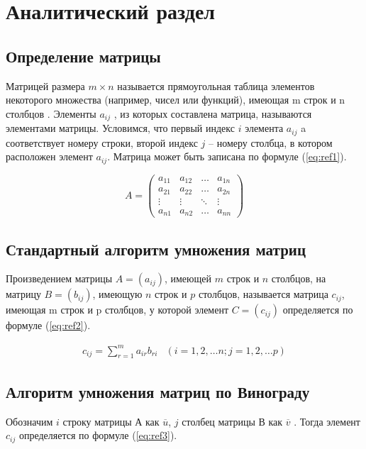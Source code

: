 \chapter{Аналитический раздел}

\section{Определение матрицы}
Матрицей размера $m \times n$ называется прямоугольная таблица элементов некоторого множества 
(например, чисел или функций), имеющая m строк и n столбцов \cite{angem}.
Элементы $a_{ij}$ , из которых составлена матрица, называются элементами матрицы.
Условимся, что первый индекс $i$ элемента $a_{ij}$ a
соответствует номеру строки, второй индекс $j$ – номеру столбца, в котором расположен элемент $a_{ij}$.
Матрица может быть записана по формуле (\ref{eq:ref1}).

\begin{equation}
	A = \left(
	\begin{array}{cccc}
		a_{11} & a_{12} & \ldots & a_{1n} \\
		a_{21} & a_{22} & \ldots & a_{2n} \\
		\vdots & \vdots & \ddots & \vdots \\
		a_{n1} & a_{n2} & \ldots & a_{nn}
	\end{array}
	\right)
	\label{eq:ref1}
\end{equation}

\section{Стандартный алгоритм умножения матриц}
Произведением матрицы $A = (a_{ij})$, имеющей $m$ строк и $n$ столбцов, на матрицу $B = (b_{ij})$, имеющую
$n$ строк и $p$ столбцов, называется матрица $c_{ij}$, имеющая m строк и p столбцов, у которой элемент 
$C = (c_{ij})$ определяется по формуле (\ref{eq:ref2}).

\begin{equation}
	\begin{array}{cc}
		c_{ij} = \sum\limits_{r=1}^m a_{ir}b_{ri} & (i=1,2,\dots n; j=1,2,\dots p)
	\end{array}
	\label{eq:ref2}
\end{equation}

\section{Алгоритм умножения матриц по Винограду}
Обозначим $i$ строку матрицы А как  $\overline{u}$, $j$ столбец матрицы В как $\overline{v}$ \cite{winograd-origin}. Тогда элемент $c_{ij}$ определяется по формуле (\ref{eq:ref3}).

